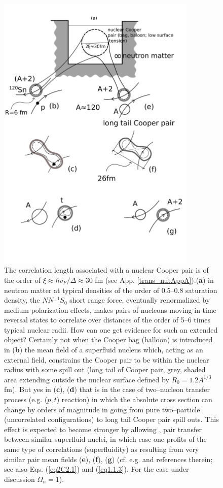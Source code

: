 \begin{figure}
	\centerline{\includegraphics*[width=0.85\textwidth,angle=0]{nutshell/figs/fig_gamma.pdf}}
\caption{The correlation length associated with a nuclear Cooper pair is of the order of $\xi\approx \hbar v_F/\Delta\approx 30 $ fm (see App. \ref{trans_nutAppA}).(\textbf{a}) in neutron matter at typical densities of the order of 0.5--0.8 saturation density, the $NN$--$^{1}S_0$ short range force, eventually renormalized by medium polarization effects, makes pairs of nucleons moving in time reversal states to correlate over distances of the order of 5--6 times typical nuclear radii. How can one get evidence for such an extended object? Certainly not when the Cooper bag (balloon) is introduced in (\textbf{b}) the mean field  of a superfluid nucleus which, acting as an external field, constrains the Cooper pair to be within the nuclear radius with some spill out (long tail of Cooper pair, grey, shaded area extending outside the nuclear surface defined by $R_0=1.2A^{1/3}$ fm). But yes in   (\textbf{c}), (\textbf{d}) that is  in the case of two--nucleon transfer process (e.g. ($p,t$) reaction) in which the absolute cross section can change by orders of magnitude in going from pure two--particle (uncorrelated configurations) to long tail Cooper pair spill outs. This effect is expected to become stronger by allowing , pair transfer between similar superfluid nuclei, in which case one profits of the same type of correlations (superfluidity) as resulting from very similar pair mean fields (\textbf{e}), (\textbf{f}), (\textbf{g}) (cf. e.g. \cite{Oertzen:13} and references therein; see also Eqs. (\ref{eq2C2.1}) and (\ref{eq1.1.3}). For the case under discussion $\Omega_n=1$).
}
\end{figure}
